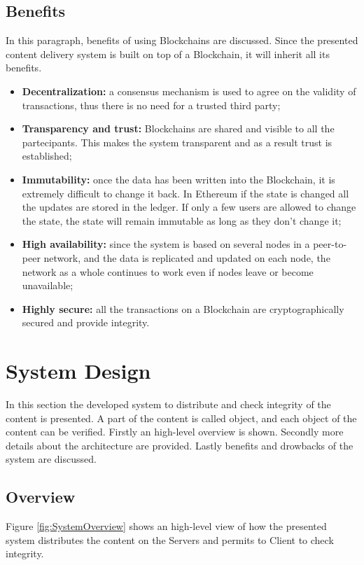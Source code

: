 \documentclass[hidelinks,conference,compsoc]{IEEEtran}
\begin{document}
\subsection{Benefits}
In this paragraph, benefits of using Blockchains are discussed. Since the presented content delivery system is built on top of a Blockchain, it will inherit all its benefits.
\begin{itemize}
	\item \textbf{Decentralization:} a consensus mechanism is used to agree on the validity of transactions, thus there is no need for a trusted third party;
	
	\item \textbf{Transparency and trust:} Blockchains are shared and visible to all the partecipants. This makes the system transparent and as a result trust is established;
	
	\item \textbf{Immutability:} once the data has been written into the Blockchain, it is extremely difficult to change it back. In Ethereum if the state is changed all the updates are stored in the ledger. If only a few users are allowed to change the state, the state will remain immutable as long as they don't change it;
	
	\item \textbf{High availability:} since the system is based on several nodes in a peer-to-peer network, and the data is replicated and updated on each node, the network as a whole continues to work even if nodes leave or become unavailable;
	
	\item \textbf{Highly secure:} all the transactions on a Blockchain are cryptographically secured and provide integrity.
	\vspace{10pt}
\end{itemize} 

\section{System Design}
In this section the developed system to distribute and check integrity of the content is presented. A part of the content is called object, and each object of the content can be verified. Firstly an high-level overview is shown. Secondly more details about the architecture are provided. Lastly benefits and drowbacks of the system are discussed.

\subsection{Overview}
Figure \ref{fig:SystemOverview} shows an high-level view of how the presented system distributes the content on the Servers and permits to Client to check integrity.
\end{document}
